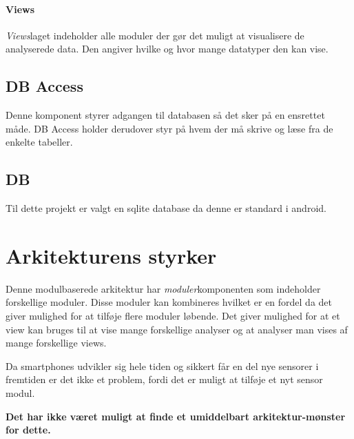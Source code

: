 \paragraph{Views}
\textit{Views}laget indeholder alle moduler der gør det muligt at visualisere de analyserede data.
Den angiver hvilke og hvor mange datatyper den kan vise.

\subsection*{DB Access}
Denne komponent styrer adgangen til databasen så det sker på en ensrettet måde.
DB Access holder derudover styr på hvem der må skrive og læse fra de enkelte tabeller.

\subsection*{DB}
Til dette projekt er valgt en sqlite database da denne er standard i android.

\section*{Arkitekturens styrker}
Denne modulbaserede arkitektur har \textit{moduler}komponenten som indeholder forskellige moduler.
Disse moduler kan kombineres hvilket er en fordel da det giver mulighed for at tilføje flere moduler løbende.
Det giver mulighed for at et view kan bruges til at vise mange forskellige analyser og at analyser man vises af mange forskellige views.

Da smartphones udvikler sig hele tiden og sikkert får en del nye sensorer i fremtiden er det ikke et problem, fordi det er muligt at tilføje et nyt sensor modul.

\textbf{Det har ikke været muligt at finde et umiddelbart arkitektur-mønster for dette.}

